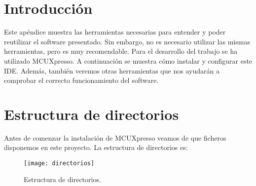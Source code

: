 
\section{Introducción}
Este apéndice muestra las herramientas necesarias para entender y poder reutilizar el software presentado. Sin embargo, no es necesario utilizar las mismas herramientas, pero es muy recomendable.
Para el desarrollo del trabajo se ha utilizado MCUXpresso. A continuación se muestra cómo instalar y configurar este IDE. Además, también veremos otras herramientas que nos ayudarán a comprobar el correcto funcionamiento del software.

\section{Estructura de directorios}
Antes de comenzar la instalación de MCUXpresso veamos de que ficheros disponemos en este proyecto.
La estructura de directorios es:

\begin{figure}[!h]
	\centering
	\texttt{[image: directorios]}
	\caption{Estructura de directorios.}
\end{figure}
\FloatBarrier

